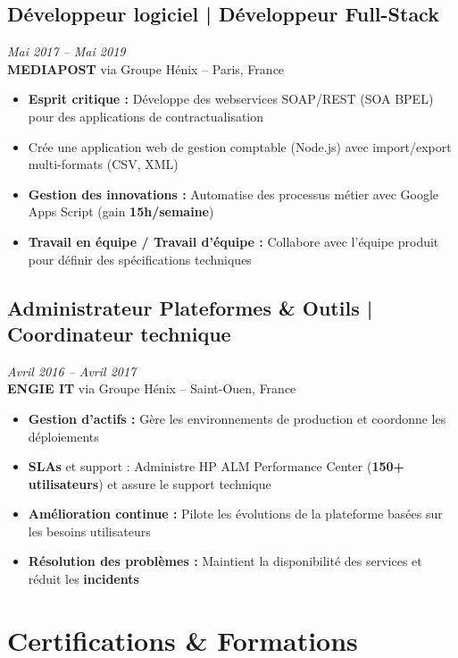 \documentclass[11pt,a4paper]{article}
\newcommand{\highlight}[1]{\textcolor{primaryblue}{\textbf{#1}}}
\newcommand{\keypoint}[1]{\textbf{#1}}
\begin{document}
\subsection*{Développeur logiciel | Développeur Full-Stack} \hfill \textit{\color{mediumgray}Mai 2017 -- Mai 2019}\\
\textcolor{primaryblue}{\textbf{MEDIAPOST}} via Groupe Hénix -- Paris, France
\begin{itemize}[leftmargin=22pt]
    \item \highlight{Esprit critique :} Développe des webservices SOAP/REST (SOA BPEL) pour des applications de contractualisation
    \item Crée une application web de gestion comptable (Node.js) avec import/export multi-formats (CSV, XML)
    \item \highlight{Gestion des innovations :} Automatise des processus métier avec Google Apps Script (gain \keypoint{15h/semaine})
    \item \highlight{Travail en équipe / Travail d'équipe :} Collabore avec l'équipe produit pour définir des spécifications techniques
\end{itemize}

\subsection*{Administrateur Plateformes \& Outils | Coordinateur technique} \hfill \textit{\color{mediumgray}Avril 2016 -- Avril 2017}\\
\textcolor{primaryblue}{\textbf{ENGIE IT}} via Groupe Hénix -- Saint-Ouen, France
\begin{itemize}[leftmargin=22pt]
    \item \highlight{Gestion d'actifs :} Gère les environnements de production et coordonne les déploiements
    \item \highlight{SLAs} et support : Administre HP ALM Performance Center (\keypoint{150+ utilisateurs}) et assure le support technique
    \item \highlight{Amélioration continue :} Pilote les évolutions de la plateforme basées sur les besoins utilisateurs
    \item \highlight{Résolution des problèmes :} Maintient la disponibilité des services et réduit les \highlight{incidents}
\end{itemize}

\vspace{6pt}

\section*{Certifications \& Formations}
\end{document}
